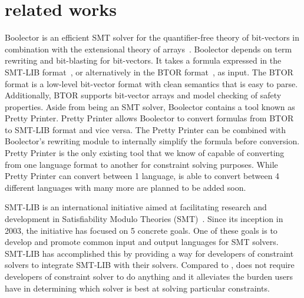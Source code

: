 \section{related works}
\label{sec:related}

Boolector is an efficient SMT solver for the quantifier-free theory
of bit-vectors in combination with the extensional theory of arrays~\cite{boolector2009}.
Boolector depends on term rewriting and bit-blasting for bit-vectors. It
takes a formula expressed in the SMT-LIB format~\cite{smtlib2015}, or alternatively in
the BTOR format~\cite{btor2008}, as input.
The BTOR format is a low-level bit-vector format with clean semantics that is easy to
parse. Additionally, BTOR supports bit-vector arrays and model checking of safety
properties.
Aside from being an SMT solver, Boolector contains a tool known as
Pretty Printer. Pretty Printer allows Boolector to convert formulas from BTOR to
SMT-LIB format and vice versa. The Pretty Printer can be combined with Boolector’s
rewriting module to internally simplify the formula before conversion.
Pretty Printer is the only existing tool that we know of capable of
converting from one language format to another for constraint solving purposes.
While Pretty Printer can convert between 1 language, \imss is able to convert
between 4 different languages with many more are planned to be added soon.

SMT-LIB is an international initiative aimed at facilitating research and development in
Satisfiability Modulo Theories (SMT)~\cite{smtlib2015}. Since its inception in 2003, the
initiative has focused on 5 concrete goals. One of these goals is to develop and promote
common input and output languages for SMT solvers.
SMT-LIB has accomplished this by providing a way for developers of constraint solvers
to integrate SMT-LIB with their solvers.
Compared to \imss, \imss does not require developers of constraint solver to
do anything and it alleviates the burden users have in
determining which solver is best at solving particular constraints.
